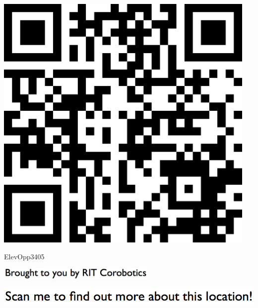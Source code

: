 \documentclass[letterpaper]{article}
\begin{document}
 \begingroup 
 \centerline{\includegraphics[scale=1,width=5in,height=5in]{ElevOpp3405.png}} 
 \endgroup 
 \vspace*{\fill} 

 \hfill{\small ElevOpp3405} 

  \vspace{0.7in} 
 
 \centerline{\includegraphics[scale=1,width=3in]{text-bottom.png}} 
 
 \pagebreak 
{} 
 \vspace*{\fill} 
 
  \centerline{\includegraphics[scale=1,width=6in]{text-top.png}} 
 
 \vspace{0.5in} 
 
\end{document}
